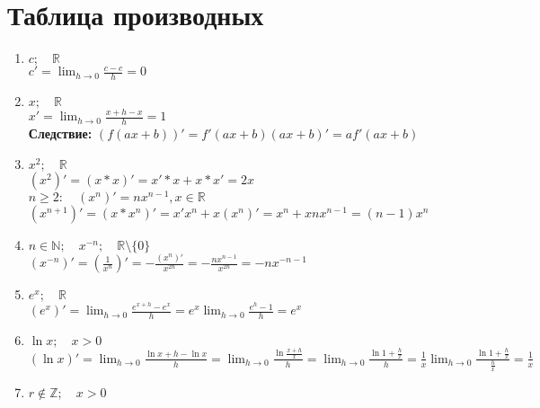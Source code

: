 


\section{Таблица производных}
\begin{properties}
    \begin{enumerate}
        \item $c; \quad \mathbb{R}$\\
            $c'=\displaystyle\lim_{h \to 0} \displaystyle\frac{c-c}{h} = 0$ 
        \item $x; \quad  \mathbb{R}$\\
            $x'=\displaystyle\lim_{h \to 0} \displaystyle\frac{x+h-x}{h}=1$ \\
            \textbf{Следствие:} $(f(ax+b))'=f'(ax+b)(ax+b)'=af'(ax+b)$
        \item $x^2; \quad  \mathbb{R}$\\
            $(x^2)'=(x*x)'=x'*x+x*x'=2x$ \\
            $n\ge 2: \quad (x^{n})'=nx^{n-1}, x \in \mathbb{R}$ \\
            $(x^{n+1})'=(x*x^{n})'=x'x^n+x(x^n)'=x^{n}+xnx^{n-1}=(n-1)x^n$ 
        \item $n \in \mathbb{N}; \quad  x^{-n}; \quad  \mathbb{R} \setminus \{0\}$\\
            $(x^{-n})'=(\displaystyle\frac{1}{x^n})'=-\displaystyle\frac{(x^n)'}{x^{2n}}=-\displaystyle\frac{nx^{n-1}}{x^{2n}}=-nx^{-n-1}$ 
        \item $e^{x}; \quad  \mathbb{R}$ \\
            $(e^{x})'=\displaystyle\lim_{h \to 0}\displaystyle\frac{e^{x+h}-e^{x}}{h}=e^{x}\displaystyle\lim_{h \to 0} \displaystyle\frac{e^{h}-1}{h}=e^{x}$
        \item $\ln {x}; \quad x>0$ \\
            $(\ln {x})'=\displaystyle\lim_{h \to 0} \displaystyle\frac{\ln {x+h}-\ln {x}}{h}=\displaystyle\lim_{h \to 0} \displaystyle\frac{\ln {\displaystyle\frac{x+h}{x}}}{h}=\displaystyle\lim_{h \to 0} \displaystyle\frac{\ln {1+\displaystyle\frac{h}{x}} }{h}=\displaystyle\frac{1}{x}\displaystyle\lim_{h \to 0} \displaystyle\frac{\ln {1+\displaystyle\frac{h}{x}} }{\displaystyle\frac{h}{x}}=\displaystyle\frac{1}{x}$ 
        \item $r \not\in \mathbb{Z}; \quad  x > 0$\\

\end{enumerate}
\end{properties}
